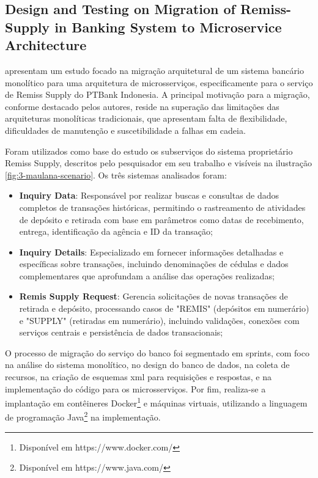\subsection{Design and Testing on Migration of Remiss-Supply in Banking System to Microservice Architecture \cite{maulana_design_2022}}

\label{subsec:maulana_design}

\textcite{maulana_design_2022} apresentam um estudo focado na migração arquitetural de um sistema bancário monolítico para uma arquitetura de microsserviços, especificamente para o serviço de Remiss Supply do PTBank Indonesia. A principal motivação para a migração, conforme destacado pelos autores, reside na superação das limitações das arquiteturas monolíticas tradicionais, que apresentam falta de flexibilidade, dificuldades de manutenção e suscetibilidade a falhas em cadeia.

Foram utilizados como base do estudo os subserviços do sistema proprietário Remiss Supply, descritos pelo pesquisador em seu trabalho e visíveis na ilustração \autoref{fig:3-maulana-scenario}. Os três sistemas analisados foram:

\begin{itemize}
    \item \textbf{Inquiry Data}: Responsável por realizar buscas e consultas de dados completos de transações históricas, permitindo o rastreamento de atividades de depósito e retirada com base em parâmetros como datas de recebimento, entrega, identificação da agência e ID da transação;
    
    \item \textbf{Inquiry Details}: Especializado em fornecer informações detalhadas e específicas sobre transações, incluindo denominações de cédulas e dados complementares que aprofundam a análise das operações realizadas;
    
    \item \textbf{Remis Supply Request}: Gerencia solicitações de novas transações de retirada e depósito, processando casos de "REMIS" (depósitos em numerário) e "SUPPLY" (retiradas em numerário), incluindo validações, conexões com serviços centrais e persistência de dados transacionais;
\end{itemize} 

O processo de migração do serviço do banco foi segmentado em sprints, com foco na análise do sistema monolítico, no design do banco de dados, na coleta de recursos, na criação de esquemas \gls{xml} para requisições e respostas, e na implementação do código para os microsserviços. Por fim, realiza-se a implantação em contêineres Docker\footnote{Disponível em https://www.docker.com/} e máquinas virtuais, utilizando a linguagem de programação Java\footnote{Disponível em https://www.java.com/} na implementação.

